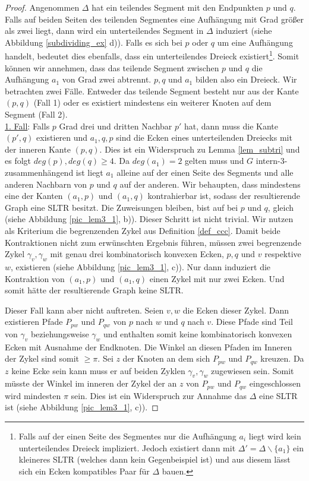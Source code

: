 \begin{proof}
Angenommen $\Delta$ hat ein teilendes Segment mit den Endpunkten $p$ und $q$. Falls auf beiden Seiten des teilenden Segmentes eine Aufhängung mit Grad größer als zwei liegt, dann wird ein unterteilendes Segment in $\Delta$ induziert (siehe Abbildung \ref{subdividing_ex} d)). Falls es sich bei $p$ oder $q$ um eine Aufhängung handelt, bedeutet dies ebenfalls, dass ein unterteilendes Dreieck existiert\footnote{Falls auf der einen Seite des Segmentes nur die Aufhängung $a_i$ liegt wird kein unterteilendes Dreieck impliziert. Jedoch existiert dann mit $\Delta' = \Delta \backslash \{a_1\}$ ein kleineres SLTR (welches dann kein Gegenbeispiel ist) und aus diesem lässt sich ein Ecken kompatibles Paar für $\Delta$ bauen.}. Somit können wir annehmen, dass das teilende Segment zwischen $p$ und $q$ die Aufhängung $a_1$ von Grad zwei abtrennt. $p,q$ und $a_1$ bilden also ein Dreieck. Wir betrachten zwei Fälle. Entweder das teilende Segment besteht nur aus der Kante $(p,q)$ (Fall 1) oder es existiert mindestens ein weiterer Knoten auf dem Segment (Fall 2).\\

\underline{1. Fall}: Falls $p$ Grad drei und dritten Nachbar $p'$ hat, dann muss die Kante $(p',q)$ existieren und $a_1,q,p$ sind die Ecken eines unterteilenden Dreiecks mit der inneren Kante $(p,q)$. Dies ist ein Widerspruch zu Lemma \ref{lem_subtri} und es folgt $deg(p),deg(q) \geq 4$. Da $deg(a_1) = 2$ gelten muss und $G$ intern-3-zusammenhängend ist liegt $a_1$ alleine auf der einen Seite des Segments und alle anderen Nachbarn von $p$ und $q$ auf der anderen. 
Wir behaupten, dass mindestens eine der Kanten $(a_1,p)$ und $(a_1,q)$ kontrahierbar ist, sodass der resultierende Graph eine SLTR besitzt. Die Zuweisungen bleiben, bist auf bei $p$ und $q$, gleich (siehe Abbildung \ref{pic_lem3_1}, b)). Dieser Schritt ist nicht trivial. Wir nutzen als Kriterium die begrenzenden Zykel aus Definition \ref{def_ccc}. Damit beide Kontraktionen nicht zum erwünschten Ergebnis führen, müssen zwei begrenzende Zykel $\gamma_v,\gamma_w$ mit genau drei kombinatorisch konvexen Ecken, $p,q$ und $v$ respektive $w$, existieren (siehe Abbildung \ref{pic_lem3_1}, c)). Nur dann induziert die Kontraktion von $(a_1,p)$ und $(a_1,q)$ einen Zykel mit nur zwei Ecken. Und somit hätte der resultierende Graph keine SLTR.

Dieser Fall kann aber nicht auftreten. Seien $v,w$ die Ecken dieser Zykel. Dann existieren Pfade $P_{pw}$ und $P_{qw}$ von $p$ nach $w$ und $q$ nach $v$. Diese Pfade sind Teil von $\gamma_v$ beziehungsweise $\gamma_w$ und enthalten somit keine kombinatorisch konvexen Ecken mit Ausnahme der Endknoten. Die Winkel an diesen Pfaden im Inneren der Zykel sind somit $\geq \pi$. Sei $z$ der Knoten an dem sich $P_{pw}$ und $P_{qw}$ kreuzen. Da $z$ keine Ecke sein kann muss er auf beiden Zyklen $\gamma_v,\gamma_w$  zugewiesen sein. Somit müsste der Winkel im inneren der Zykel der an $z$ von $P_{pw}$ und $P_{qw}$ eingeschlossen wird mindesten $\pi$ sein. Dies ist ein Widerspruch zur Annahme das $\Delta$ eine SLTR ist (siehe Abbildung \ref{pic_lem3_1}, c)).


\end{proof}
